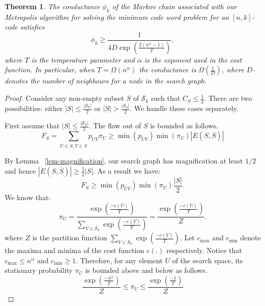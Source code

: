 \documentclass{sig-alternate-2013}
\newtheorem{theorem}{Theorem}[section]
\begin{document}
\begin{theorem}
  \label{theorem-conductance} The conductance $\phi_k$ of the Markov
  chain associated with our Metropolis algorithm for solving the
  minimum code word problem for an $[n,k]$-code satisfies
  \[
  \phi_k \geq \frac{1}{4D\exp{\left(\frac{2(n^\alpha-1)}{T}\right)}},
  \] 
  where $T$ is the temperature parameter and $\alpha$ is the exponent
  used in the cost function. In particular, when $T=\Omega(n^\alpha)$
  the conductance is $\Omega\left(\frac{1}{D}\right)$, where
  $D$-denotes the number of neighbours for a node in the search graph.
\end{theorem}
\begin{proof}
  Consider any non-empty subset $S$ of $\mathcal{S}_k$ such that $C_S
  \leq \frac{1}{2}$. There are two possibilities: either $ |S| \leq
  \frac{|\mathcal{S}_k|}{2}$ or $ |S| > \frac{|
    \mathcal{S}_k|}{2}$. We handle these cases separately.
  
  First assume that $ |S| \leq \frac{| \mathcal{S}_k|}{2}$. The flow
  out of $S$ is bounded as follows.
  \begin{displaymath}
  F_S = \sum_{U\in S, V \in \overline{S}}p_{UV}\pi_U
  \geq  \min(p_{UV})\min(\pi_U)|E(S, \overline{S})| 
\end{displaymath}

By Lemma ~\ref{lem-magnification}, our search graph has magnification at
least $1/2$ and hence $|E(S,\overline{S})| \geq \frac{1}{2}|
S|$. As a result we have:
\begin{equation}
  \label{eq3}
  F_S \geq \min(p_{UV})\min(\pi_U)\frac{| S| }{2}.
\end{equation}
We know that:
\begin{displaymath}
  \pi_U = \frac{\exp\left({\frac{-c(U)}{T}}\right)}
  {\sum_{V \in \mathcal{S}_k}\exp\left({\frac{-c(V)}{T}}\right)} 
  = \frac{\exp\left({\frac{-c(U)}{T}}\right)}{Z}.
\end{displaymath}
where $Z$ is the partition function $\sum_{V \in
  \mathcal{S}_k}\exp\left({\frac{-c(V)}{T}}\right)$.  Let $c_{\max}$ and
$c_{\min}$ denote the maxima and minima of the cost function $c(.)$
respectively. Notice that $c_{\max} \leq n^\alpha$ and $c_{\min} \geq
1$. Therefore, for any element $U$ of the search space, its stationary
probability $\pi_U$ is bounded above and below as follows.
\begin{equation}
  \frac{\exp\left({\frac{-n^\alpha}{T}}\right)}{Z} 
  \leq \pi_U 
  \leq \frac{\exp\left({\frac{-1}{T}}\right)}{Z}
  \label{eq4}
\end{equation}


\end{proof}
\end{document}
